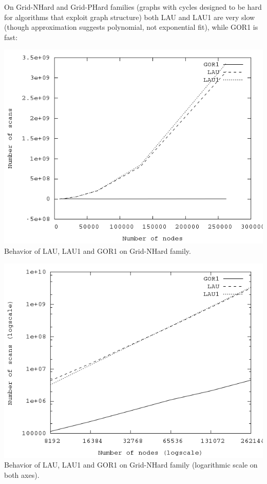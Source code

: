 \documentclass{article}
\theoremstyle{definition}
\begin{document}
\begin{multicols}{2}
On Grid-NHard and Grid-PHard families (graphs with cycles designed to be hard for algorithms that exploit graph structure)
both LAU and LAU1 are very slow (though approximation suggests polynomial, not exponential fit),
while GOR1 is fast:

\begin{center}
\includegraphics[width=\linewidth]{img/plot_grid_nhard.png}
\nolinebreak[4]
\\\footnotesize{Behavior of LAU, LAU1 and GOR1 on Grid-NHard family.}
\end{center}

\begin{center}
\includegraphics[width=\linewidth]{img/plot_grid_nhard_logscale.png}
\nolinebreak[4]
\\\footnotesize{Behavior of LAU, LAU1 and GOR1 on Grid-NHard family (logarithmic scale on both axes).}
\end{center}


\end{multicols}
\end{document}
